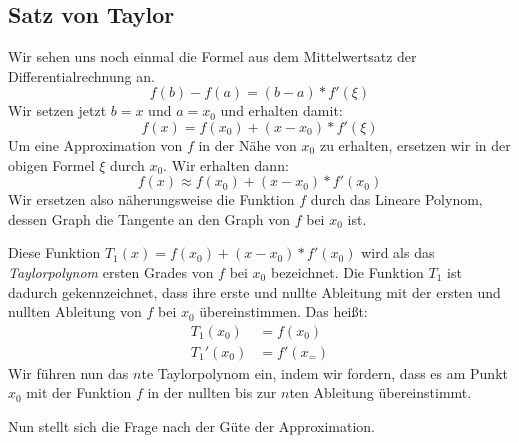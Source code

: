 \subsection{Satz von Taylor}
Wir sehen uns noch einmal die Formel aus dem Mittelwertsatz der Differentialrechnung an.
\begin{equation*}
	f(b)-f(a)=(b-a)*f'(\xi)
\end{equation*}
Wir setzen jetzt $b=x$ und $a=x_0$ und erhalten damit:
\begin{equation*}
	f(x)=f(x_0)+(x-x_0)*f'(\xi)
\end{equation*}
Um eine Approximation von $f$ in der Nähe von $x_0$ zu erhalten, ersetzen wir in der obigen Formel $\xi$ durch $x_0$. Wir erhalten dann:
\begin{equation*}
	f(x)\approx f(x_0)+(x-x_0)*f'(x_0)
\end{equation*}
Wir ersetzen also näherungsweise die Funktion $f$ durch das Lineare Polynom, dessen Graph die Tangente an den Graph von $f$ bei $x_0$ ist.

Diese Funktion $T_1(x)=f(x_0)+(x-x_0)*f'(x_0)$ wird als das \emph{Taylorpolynom} ersten Grades von $f$ bei $x_0$ bezeichnet. Die Funktion $T_1$ ist dadurch gekennzeichnet, dass ihre erste und nullte Ableitung mit der ersten und nullten Ableitung von $f$ bei $x_0$ übereinstimmen. Das heißt:
\begin{align*}
	T_1(x_0)&=f(x_0)\\
	T_1'(x_0)&=f'(x_=)
\end{align*}
Wir führen nun das $n$te Taylorpolynom ein, indem wir fordern, dass es am Punkt $x_0$ mit der Funktion $f$ in der nullten bis zur $n$ten Ableitung übereinstimmt.

Nun stellt sich die Frage nach der Güte der Approximation.

